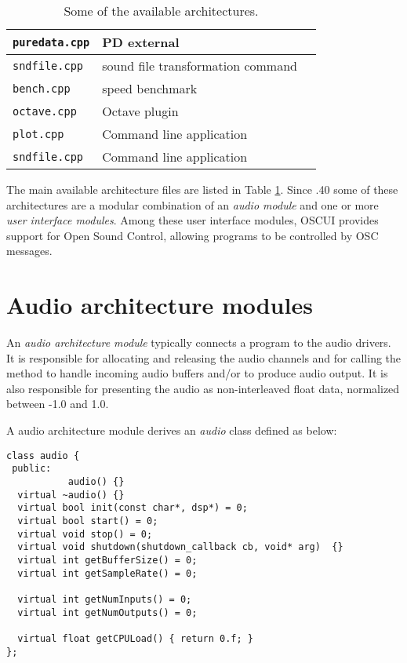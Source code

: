 \begin{table}[htp]
\begin{center}
\begin{tabular}{|l|l|l|}
\texttt{puredata.cpp} 		& PD external  \\
\hline
\texttt{sndfile.cpp} 		& sound file transformation command \\
\texttt{bench.cpp} 		& speed benchmark   \\
\texttt{octave.cpp} 		& Octave plugin   \\
\texttt{plot.cpp} 			& Command line application    \\
\texttt{sndfile.cpp} 		& Command line application    \\
\hline
\end{tabular}
\end{center}
\caption{Some of the available architectures.}
\label{tab:availablearch}
\end{table}%

The main available architecture files are listed in Table \ref{tab:availablearch}. Since .40 some of these architectures are a modular combination of an \emph{audio module} and one or more \emph{user interface modules}. Among these user interface modules, OSCUI provides support for Open Sound Control, allowing \faust programs to be controlled by OSC messages. 

\section{Audio architecture modules} 
An \emph{audio architecture module} typically connects a \faust program to the audio drivers.
It is responsible for allocating and releasing the audio channels and for calling the \faust {} method to handle incoming audio buffers and/or to produce audio output. It is also responsible for presenting the audio as non-interleaved float data, normalized between -1.0 and 1.0.

A \faust audio architecture module derives an \emph{audio} class defined as below:
\begin{lstlisting}[basicstyle=\ttfamily\footnotesize\color{yotxt}]
class audio {
 public:
           audio() {}
  virtual ~audio() {}
  virtual bool init(const char*, dsp*) = 0;
  virtual bool start() = 0;
  virtual void stop() = 0;
  virtual void shutdown(shutdown_callback cb, void* arg)  {}
  virtual int getBufferSize() = 0;
  virtual int getSampleRate() = 0;
    
  virtual int getNumInputs() = 0;
  virtual int getNumOutputs() = 0;
    
  virtual float getCPULoad() { return 0.f; }
};
\end{lstlisting} 

